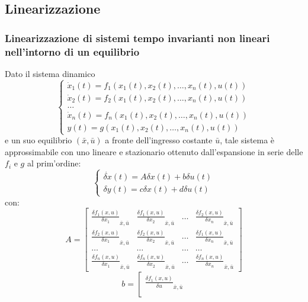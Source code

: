 \begin{landscape}
\begin{multicols*}{3}
    \subsection*{Linearizzazione}
    \subsubsection*{Linearizzazione di sistemi tempo invarianti non lineari nell'intorno di un equilibrio}
    Dato il sistema dinamico 
    \[
        \begin{cases}
            \dot{x}_1(t) = f_1(x_1(t),x_2(t),\dots,x_n(t),u(t))\\
            \dot{x}_2(t) = f_2(x_1(t),x_2(t),\dots,x_n(t),u(t))\\
            \dots\\
            \dot{x}_n(t) = f_n(x_1(t),x_2(t),\dots,x_n(t),u(t))\\
            y(t) = g(x_1(t),x_2(t),\dots,x_n(t),u(t))
        \end{cases}
    \]
    e un suo equilibrio $(\bar{x}, \bar{u})$ a fronte dell'ingresso costante $\bar{u}$, tale sistema è approssimabile con uno lineare e stazionario ottenuto dall'espansione in serie delle $f_i$ e $g$ al prim'ordine:
    \[
        \begin{cases}
            \dot{\delta x} (t) = A \delta x(t) + b \delta u(t)\\
            \delta y (t) = c \delta x (t) + d \delta u (t)
        \end{cases}
    \]
    con:
    \[
        A = \left[\begin{matrix}
            \frac{\delta f_1 (x,u)}{\delta x_1}_{\bar{x}, \bar{u}} & \frac{\delta f_1 (x,u)}{\delta x_2}_{\bar{x}, \bar{u}} & \dots & \frac{\delta f_2 (x,u)}{\delta x_n}_{\bar{x}, \bar{u}}\\
            \frac{\delta f_2(x,u)}{\delta x_1}_{\bar{x}, \bar{u}} & \frac{\delta f_2(x,u)}{\delta x_2}_{\bar{x}, \bar{u}} & \dots & \frac{\delta f_1(x,u)}{\delta x_n}_{\bar{x}, \bar{u}}\\
            \dots & \dots & \dots & \dots\\
            \frac{\delta f_n(x,u)}{\delta x_1}_{\bar{x}, \bar{u}} & \frac{\delta f_n (x,u)}{\delta x_2}_{\bar{x}, \bar{u}} & \dots & \frac{\delta f_n (x,u)}{\delta x_n}_{\bar{x}, \bar{u}} 
        \end{matrix}\right]
    \]
    \[
        b = \left[\begin{matrix}
            \frac{\delta f_1 (x,u)}{\delta u}_{\bar{x}, \bar{u}}\\

\end{matrix}\]
\end{multicols*}
\end{landscape}
